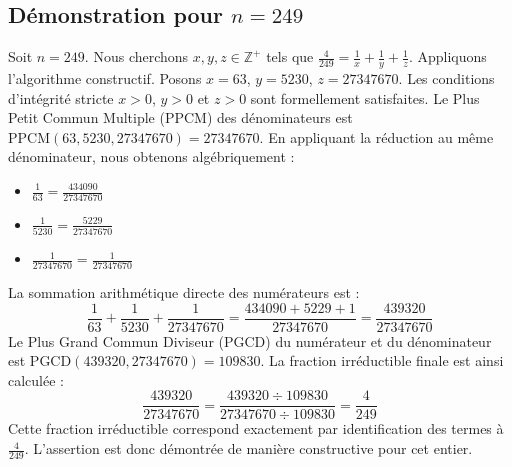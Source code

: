 \documentclass[11pt,a4paper]{article}
\begin{document}
\subsection{Démonstration pour $n = 249$}
Soit $n = 249$. Nous cherchons $x, y, z \in \mathbb{Z}^{+}$ tels que $\frac{4}{249} = \frac{1}{x} + \frac{1}{y} + \frac{1}{z}$.
Appliquons l'algorithme constructif. Posons $x = 63$, $y = 5230$, $z = 27347670$.
Les conditions d'intégrité stricte $x > 0$, $y > 0$ et $z > 0$ sont formellement satisfaites.
Le Plus Petit Commun Multiple (PPCM) des dénominateurs est $\text{PPCM}(63, 5230, 27347670) = 27347670$.
En appliquant la réduction au même dénominateur, nous obtenons algébriquement :
\begin{itemize}
    \item $\frac{1}{63} = \frac{434090}{27347670}$
    \item $\frac{1}{5230} = \frac{5229}{27347670}$
    \item $\frac{1}{27347670} = \frac{1}{27347670}$
\end{itemize}
La sommation arithmétique directe des numérateurs est :
$$ \frac{1}{63} + \frac{1}{5230} + \frac{1}{27347670} = \frac{434090 + 5229 + 1}{27347670} = \frac{439320}{27347670} $$
Le Plus Grand Commun Diviseur (PGCD) du numérateur et du dénominateur est $\text{PGCD}(439320, 27347670) = 109830$.
La fraction irréductible finale est ainsi calculée :
$$ \frac{439320}{27347670} = \frac{439320 \div 109830}{27347670 \div 109830} = \frac{4}{249} $$
Cette fraction irréductible correspond exactement par identification des termes à $\frac{4}{249}$. L'assertion est donc démontrée de manière constructive pour cet entier.
\end{document}
